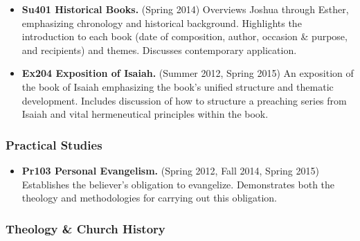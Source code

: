 {\begin{itemize}
\itemsep1pt\parskip0pt
\item
  \textbf{Su401 Historical Books.} (Spring 2014) Overviews Joshua through Esther, emphasizing chronology and historical background. Highlights the introduction to each book (date of composition, author, occasion \& purpose, and recipients) and themes. Discusses contemporary application.
\item
  \textbf{Ex204 Exposition of Isaiah.} (Summer 2012, Spring 2015) An exposition of the book of Isaiah emphasizing the book's unified structure and thematic development. Includes discussion of how to structure a preaching series from Isaiah and vital hermeneutical principles within the book.
\end{itemize}

\subsubsection{Practical Studies}\label{practical-studies}

\begin{itemize}
\itemsep1pt\parskip0pt
\item
  \textbf{Pr103 Personal Evangelism.} (Spring 2012, Fall 2014, Spring 2015) Establishes the believer's obligation to evangelize. Demonstrates both the theology and methodologies for carrying out this obligation.
\end{itemize}

\subsubsection{Theology \& Church History}\label{theology-church-history}

}
